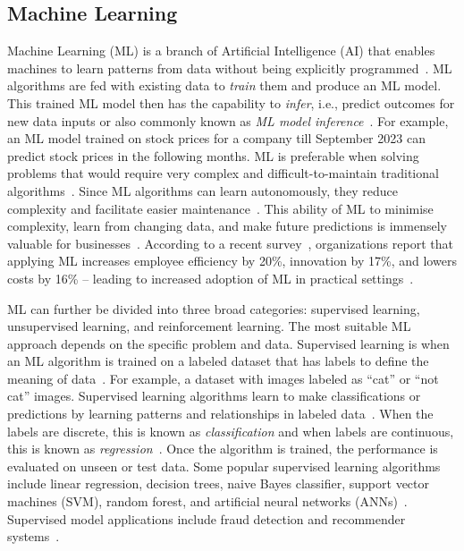 \subsection{Machine Learning}
Machine Learning (ML) is a branch of Artificial Intelligence (AI) that enables machines to learn patterns from data without being explicitly programmed~\cite{samuel1959machine}. ML algorithms are fed with existing data to \textit{train} them and produce an ML model. This trained ML model then has the capability to \textit{infer}, i.e., predict outcomes for new data inputs or also commonly known as \emph{ML model inference}~\cite{mueller2021machine}. For example, an ML model trained on stock prices for a company till September 2023 can predict stock prices in the following months. ML is preferable when solving problems that would require very complex and difficult-to-maintain traditional algorithms~\cite{geron2022hands}. Since ML algorithms can learn autonomously, they reduce complexity and facilitate easier maintenance~\cite{geron2022hands}. This ability of ML to minimise complexity, learn from changing data, and make future predictions is immensely valuable for businesses~\cite{lee2020machine}. According to a recent survey~\cite{rackspace2023report}, organizations report that applying ML increases employee efficiency by 20\%, innovation by 17\%, and lowers costs by 16\% -- leading to increased adoption of ML in practical settings~\cite{rackspace2023report}.

ML can further be divided into three broad categories: supervised learning, unsupervised learning, and reinforcement learning. The most suitable ML approach depends on the specific problem and data.
%
Supervised learning is when an ML algorithm is trained on a labeled dataset that has labels to define the meaning of data~\cite{mueller2021machine}. For example, a dataset with images labeled as ``cat'' or ``not cat'' images. Supervised learning algorithms learn to make classifications or predictions by learning patterns and relationships in labeled data~\cite{lee2020machine,mueller2021machine}. When the labels are discrete, this is known as \textit{classification} and when labels are continuous, this is known as \textit{regression}~\cite{mueller2021machine}. Once the algorithm is trained, the performance is evaluated on unseen or test data. Some popular supervised learning algorithms include linear regression, decision trees, naive Bayes classifier, support vector machines (SVM), random forest, and artificial neural networks (ANNs)~\cite{lee2020machine}. Supervised model applications include fraud detection and recommender systems~\cite{mueller2021machine}. 

